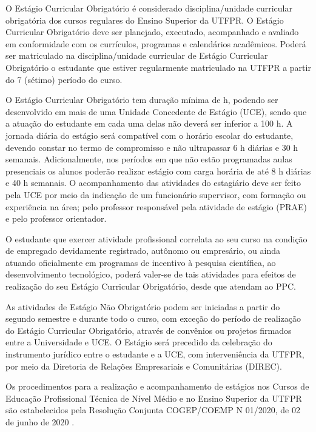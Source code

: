 O Estágio Curricular Obrigatório é considerado disciplina/unidade curricular obrigatória dos cursos regulares do Ensino Superior da UTFPR. O Estágio Curricular Obrigatório deve ser planejado, executado, acompanhado e avaliado em conformidade com os currículos, programas e calendários acadêmicos. Poderá ser matriculado na disciplina/unidade curricular de Estágio Curricular Obrigatório o estudante que estiver regularmente matriculado na UTFPR a partir do 7\textordmasculine{} (sétimo) período do curso.

O Estágio Curricular Obrigatório tem duração mínima de  h, podendo ser desenvolvido em mais de uma Unidade Concedente de Estágio (UCE), sendo que a atuação do estudante em cada uma delas não deverá ser inferior a 100 h. A jornada diária do estágio será compatível com o horário escolar do estudante, devendo constar no termo de compromisso e não ultrapassar 6 h diárias e 30 h semanais. Adicionalmente, nos períodos em que não estão programadas aulas presenciais os alunos poderão realizar estágio com carga horária de até 8 h diárias e 40 h semanais. O acompanhamento das atividades do estagiário deve ser feito pela UCE por meio da indicação de um funcionário supervisor, com formação ou experiência na área; pelo professor responsável pela atividade de estágio (PRAE) e pelo professor orientador.

O estudante que exercer atividade profissional correlata ao seu curso na condição de empregado devidamente registrado, autônomo ou empresário, ou ainda atuando oficialmente em programas de incentivo à pesquisa científica, ao desenvolvimento tecnológico, poderá valer-se de tais atividades para efeitos de realização do seu Estágio Curricular Obrigatório, desde que atendam ao PPC.

As atividades de Estágio Não Obrigatório podem ser iniciadas a partir do segundo semestre e durante todo o curso, com exceção do período de realização do Estágio Curricular Obrigatório, através de convênios ou projetos firmados entre a Universidade e UCE. O Estágio será precedido da celebração do instrumento jurídico entre o estudante e a UCE, com interveniência da UTFPR, por meio da Diretoria de Relações Empresariais e Comunitárias (DIREC).

Os procedimentos para a realização e acompanhamento de estágios nos Cursos de Educação Profissional Técnica de Nível Médio e no Ensino Superior da UTFPR são estabelecidos pela Resolução Conjunta COGEP/COEMP N\textordmasculine{} 01/2020, de 02 de junho de 2020 \cite{cogepcoemp1:2020}.

